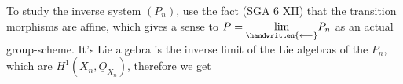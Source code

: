 To study the inverse system $(P_n)$, use the fact (SGA 6 XII) that the transition morphisms are affine, which gives a sense to $P=\underset{\handwritten{\longleftarrow}}{\lim}P_n$ as an actual group-scheme. It's Lie algebra is the inverse limit of the Lie algebras of the $P_n$, which are $H^1(X_n,\underline{O}_{X_n})$, therefore we get
